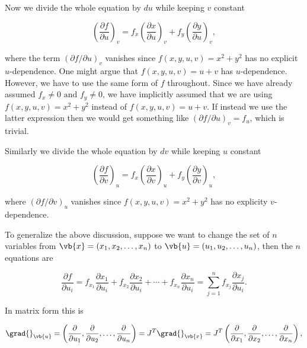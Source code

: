 \documentclass[english,a4paper,12pt]{report}
\begin{document}
Now we divide the whole equation by \(du\) while keeping \(v\) constant 

\begin{equation} \label{changeofvar} 
    \left( \frac{\partial f}{\partial u}  \right)_{v} = f_{x}  \left( \frac{\partial x}{\partial u}  \right)_{v}  + f_{y}  \left( \frac{\partial y}{\partial u}  \right)_{v},
\end{equation}

where the term \((\partial f/\partial u)_{v} \) vanishes since \(f(x,y,u,v) = x^2+y^2\) has no explicit \(u\)-dependence. One might argue that \(f(x,y,u,v) = u+v\) has \(u\)-dependence. However, we have to use the same form of \(f\) throughout. Since we have already assumed \(f_{x} \neq 0 \text { and } f_{y} \neq 0  \), we have implicitly assumed that we are using \(f(x,y,u,v) = x^2+y^2\) instead of \(f(x,y,u,v) = u+v\). If instead we use the latter expression then we would get something like \((\partial f /\partial u )_{v} = f_{u}  \), which is trivial.

Similarly we divide the whole equation by \(dv\) while keeping \(u\) constant

\begin{equation}
	\left( \frac{\partial f}{\partial v}  \right)_{u} = f_{x} \left( \frac{\partial x}{\partial v}  \right)_{u} + f_{y}  \left( \frac{\partial y}{\partial v}  \right)_{u},
\end{equation}

where \((\partial f/\partial v)_{u} \) vanishes since \(f(x,y,u,v) = x^2+y^2\) has no explicity \(v\)-dependence.  

To generalize the above discussion, suppose we want to change the set of \(n\) variables from \(\vb{x} = (x_1 ,x_2 ,\ldots ,x_{n} )\) to \(\vb{u} =(u_1 ,u_2 ,\ldots ,u_{n} ) \), then the \(n\) equations are 

\begin{equation}
	\frac{\partial f}{\partial u_{i} } = f_{x_1 } \frac{\partial x_1}{\partial u_{i} } + f_{x_2 } \frac{\partial x_2 }{\partial u_{i} } + \cdots + f_{x_{n} } \frac{\partial x_{n} }{\partial u_{i} } = \sum_{j=1}^{n} f_{x_{j} } \frac{\partial x_{j} }{\partial u_{i} }.
\end{equation}

In matrix form this is

\begin{equation}
	\grad{}_{\vb{u} } = \left( \frac{\partial }{\partial u_1}, \frac{\partial }{\partial u_2 }, \ldots ,\frac{\partial }{\partial u_{n} }  \right) = J^T \grad{}_{\vb{x} } = J^T \left( \frac{\partial }{\partial x_1 }, \frac{\partial }{\partial x_2 }, \ldots , \frac{\partial }{\partial x_{n} }    \right),
\end{equation}
\end{document}
